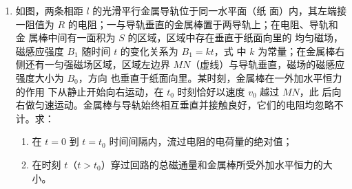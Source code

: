 \begin{enumerate}


\item 
{}
如图，两条相距 $ l $ 的光滑平行金属导轨位于同一水平面（纸
面）内，其左端接一阻值为 $ R $ 的电阻；一与导轨垂直的金属棒置于两导轨上；在电阻、导轨和金
属棒中间有一面积为 $ S $ 的区域，区域中存在垂直于纸面向里的
均匀磁场，磁感应强度 $ B_{1} $ 随时间 $ t $ 的变化关系为 $ B_1=kt $，式
中 $ k $ 为常量；在金属棒右侧还有一匀强磁场区域，区域左边界
$ MN $（虚线）与导轨垂直，磁场的磁感应强度大小为 $ B_{0} $，方向
也垂直于纸面向里。某时刻，金属棒在一外加水平恒力的作用
下从静止开始向右运动，在 $ t_{0} $ 时刻恰好以速度 $ v_{0} $ 越过 $ MN $，此
后向右做匀速运动。金属棒与导轨始终相互垂直并接触良好，它们的电阻均忽略不计。求：
\begin{enumerate}
\item
在 $ t=0 $ 到 $ t= t_{0} $ 时间间隔内，流过电阻的电荷量的绝对值；
\item 
在时刻 $ t $（$ t> t_{0} $）穿过回路的总磁通量和金属棒所受外加水平恒力的大小。


\end{enumerate}
\begin{figure}[h!]
\flushright

\end{figure}





\end{enumerate}
